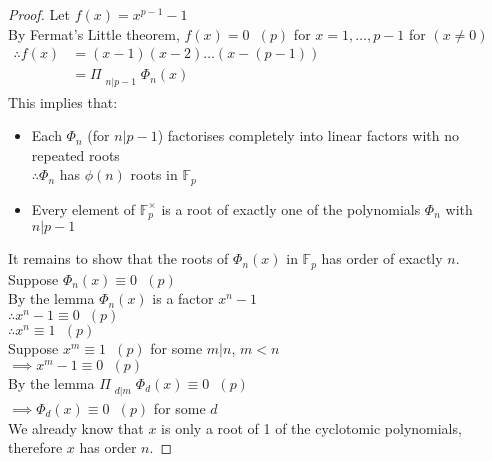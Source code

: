 \documentclass[11pt]{article}
\begin{document}
\begin{proof}
	Let $f(x) = x^{p-1} -1$\\
	By Fermat's Little theorem, $f(x) = 0 \hspace{7pt} (p) $ for $x=1,\dots, p-1 $ for $(x\neq 0)$ 
	\begin{align*}
		\therefore f(x) &= (x-1)(x-2)\dots (x-(p-1)) &&&&&&&&&&&&&&&&&&&\\
		&= \Pi_{\substack{n|p-1}} \Phi_n (x)
	\end{align*}
	This implies that:
	\begin{itemize}
		\item{Each $\Phi_n $ (for $n|p-1$) factorises completely into linear factors with no repeated roots\\ $\therefore \Phi_n $ has $\phi(n)$ roots in $\mathbb{F}_p$  }
		\item{Every element of $\mathbb{F}^\times_p$ is a root of exactly one of the polynomials $\Phi_n$ with $n|p-1$ } 
	\end{itemize}
	It remains to show that the roots of $\Phi_n(x)$ in $\mathbb{F}_p$ has order of exactly $n$.\\
	Suppose $\Phi_n(x) \equiv 0 \hspace{7pt}(p)$\\[1em]
	By the lemma $\Phi_n(x)$ is a factor $x^n -1$ \\
	\hspace{140pt} $\therefore x^n - 1 \equiv 0 \hspace{7pt}(p)$\\
	\hspace{140pt} $\therefore x^n \equiv 1 \hspace{7pt} (p)$\\[1em]
	Suppose $x^m \equiv 1 \hspace{7pt} (p) $ for some $m|n$, $m<n$\\[0.5em]
	\hspace{12pt} $\implies x^m - 1 \equiv 0 \hspace{7pt} (p)$\\[1em]

	By the lemma $\Pi_{\substack{d|m}}\Phi_d(x) \equiv 0 \hspace{7pt} (p)$\\[0.5em]
	\hspace{41pt} $\implies \Phi_d(x) \equiv 0\hspace{7pt} (p)$ for some $d$ \hspace{7pt}\lightning \\
We already know that $x$ is only a root of 1 of the cyclotomic polynomials, therefore $x$ has order $n$. 
\end{proof}
\end{document}
